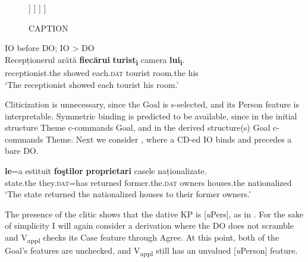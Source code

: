 \documentclass[output=paper,colorlinks,citecolor=brown,nonflat]{./langscibook}
\begin{document}
\begin{figure}%
	\begin{forest}
		[\textit{v}P
			[\textit{v}
			]
			[V\textsubscript{Appl}P
				[V\textsubscript{Appl}\\
					{[}\textit{u}Pers:\_\_{,} \textit{u}Case:\_\_{]}
				]
				[VP
					[DP\textsubscript{Theme}\\{[}Case: \textsc{acc}{]}
					]
					[V'
						[V\\P+V
						]
						[KP\textsubscript{Goal}\\{[}\textit{u}Case: \textsc{dat}{,} \textit{i}Pers{]}
						]
					]
				]
			]
		]
	\end{forest}
	\caption{\label{fig:cornilescu:8} CAPTION \missingcaption}
\end{figure}

\ea%
      \label{ex:cornilescu:25}
      IO before DO; IO > DO \\
      \gll Recepționerul arătă \textbf{fiecărui} \textbf{turist\textsubscript{i}} camera \textbf{lui\textsubscript{i}}.\\
           receptionist.the showed each.\textsc{dat} tourist room.the his\\
      \glt ‘The receptionist showed each tourist his room.’ \citep{CornilescuDinuTigău2017DOC}
      \z

Cliticization is unnecessary, since the Goal is s-selected, and its Person feature is interpretable. Symmetric binding is predicted to be available, since in the initial structure Theme c-commands Goal, and in the derived structure(s) Goal c-commands Theme. Next we consider , where a CD-ed IO binds and precedes a bare DO. 

\ea%
 \label{ex:cornilescu:26}
  \textbf{le}=a {estituit} \textbf{foştilor} \textbf{proprietari} {casele} {naționalizate}.\\
 state.the they.\textsc{dat}=has returned former.the.\textsc{dat} owners houses.the nationalized\\
 \glt ‘The state returned the nationalized houses to their former owners.’
 \z

The presence of the clitic shows that the dative KP is [\textit{u}Pers], as in . For the sake of simplicity I will again consider a derivation where the DO does not scramble and V\textsubscript{appl} checks its Case feature through Agree. At this point, both of the Goal’s features are unchecked, and V\textsubscript{appl} still has an unvalued [\textit{u}Person] feature.
\end{document}
